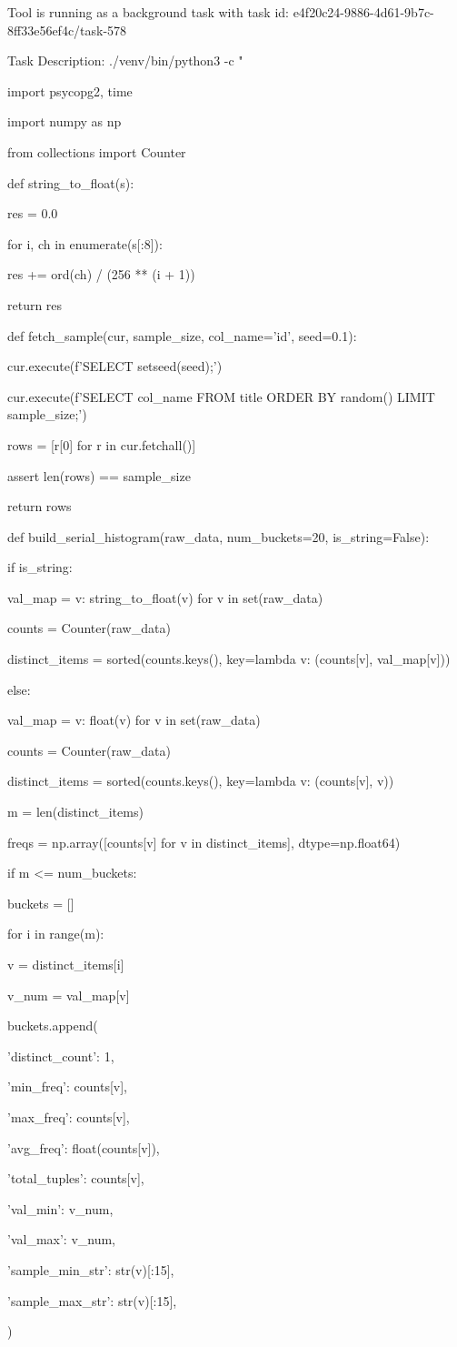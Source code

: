 \documentclass[11pt,a4paper]{article}
\begin{document}
Tool is running as a background task with task id: e4f20c24-9886-4d61-9b7c-8ff33e56ef4c/task-578

Task Description: ./venv/bin/python3 -c "

import psycopg2, time

import numpy as np

from collections import Counter


def string\_to\_float(s):

res = 0.0

for i, ch in enumerate(s[:8]):

res += ord(ch) / (256 ** (i + 1))

return res


def fetch\_sample(cur, sample\_size, col\_name='id', seed=0.1):

cur.execute(f'SELECT setseed({seed});')

cur.execute(f'SELECT {col\_name} FROM title ORDER BY random() LIMIT {sample\_size};')

rows = [r[0] for r in cur.fetchall()]

assert len(rows) == sample\_size

return rows


def build\_serial\_histogram(raw\_data, num\_buckets=20, is\_string=False):

if is\_string:

val\_map = {v: string\_to\_float(v) for v in set(raw\_data)}

counts = Counter(raw\_data)

distinct\_items = sorted(counts.keys(), key=lambda v: (counts[v], val\_map[v]))

else:

val\_map = {v: float(v) for v in set(raw\_data)}

counts = Counter(raw\_data)

distinct\_items = sorted(counts.keys(), key=lambda v: (counts[v], v))


m = len(distinct\_items)

freqs = np.array([counts[v] for v in distinct\_items], dtype=np.float64)


if m <= num\_buckets:

buckets = []

for i in range(m):

v = distinct\_items[i]

v\_num = val\_map[v]

buckets.append({

'distinct\_count': 1,

'min\_freq': counts[v],

'max\_freq': counts[v],

'avg\_freq': float(counts[v]),

'total\_tuples': counts[v],

'val\_min': v\_num,

'val\_max': v\_num,

'sample\_min\_str': str(v)[:15],

'sample\_max\_str': str(v)[:15],

})
\end{document}
